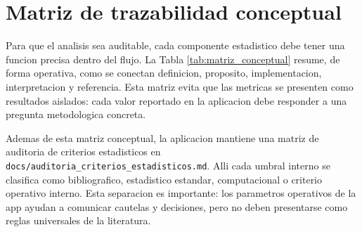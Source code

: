 ﻿\documentclass[12pt,letterpaper]{article}
\begin{document}
\section{Matriz de trazabilidad conceptual}

Para que el analisis sea auditable, cada componente estadistico debe tener una funcion precisa dentro del flujo. La Tabla \ref{tab:matriz_conceptual} resume, de forma operativa, como se conectan definicion, proposito, implementacion, interpretacion y referencia. Esta matriz evita que las metricas se presenten como resultados aislados: cada valor reportado en la aplicacion debe responder a una pregunta metodologica concreta.

Ademas de esta matriz conceptual, la aplicacion mantiene una matriz de auditoria de criterios estadisticos en \texttt{docs/auditoria\_criterios\_estadisticos.md}. Alli cada umbral interno se clasifica como bibliografico, estadistico estandar, computacional o criterio operativo interno. Esta separacion es importante: los parametros operativos de la app ayudan a comunicar cautelas y decisiones, pero no deben presentarse como reglas universales de la literatura.
\end{document}
